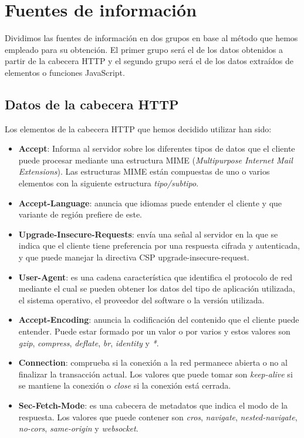 \chapter{Fuentes de información}
Dividimos las fuentes de información en dos grupos en base al método que hemos empleado para su obtención. El primer grupo será el de los datos obtenidos a partir de la cabecera HTTP y el segundo grupo será el de los datos extraídos de elementos o funciones JavaScript.
\section{Datos de la cabecera HTTP}
\noindent Los elementos de la cabecera HTTP que hemos decidido utilizar han sido:
\begin{itemize}
    \item \textbf{Accept}: Informa al servidor sobre los diferentes tipos de datos que el cliente puede procesar mediante una estructura MIME (\textit{Multipurpose Internet Mail Extensions}). Las estructuras MIME están compuestas de uno o varios elementos con la siguiente estructura \textit{tipo/subtipo}.
    \item \textbf{Accept-Language}: anuncia que idiomas puede entender el cliente y que variante de región prefiere de este.
    \item \textbf{Upgrade-Insecure-Requests}: envía una señal al servidor en la que se indica que el cliente tiene preferencia por una respuesta cifrada y autenticada, y que puede manejar la directiva CSP upgrade-insecure-request.
    \item \textbf{User-Agent}: es una cadena característica que identifica el protocolo de red mediante el cual se pueden obtener los datos del tipo de aplicación utilizada, el sistema operativo, el proveedor del software o la versión utilizada.
    \item \textbf{Accept-Encoding}: anuncia la codificación del contenido que el cliente puede entender. Puede estar formado por un valor o por varios y estos valores son \textit{gzip}, \textit{compress}, \textit{deflate}, \textit{br}, \textit{identity} y \textit{*}.
    \item \textbf{Connection}: comprueba si la conexión a la red permanece abierta o no al finalizar la transacción actual. Los valores que puede tomar son \textit{keep-alive} si se mantiene la conexión o \textit{close} si la conexión está cerrada.
    \item \textbf{Sec-Fetch-Mode}: es una cabecera de metadatos que indica el modo de la respuesta. Los valores que puede contener son \textit{cros}, \textit{navigate}, \textit{nested-navigate}, \textit{no-cors}, \textit{same-origin} y \textit{websocket}.

\end{itemize}
